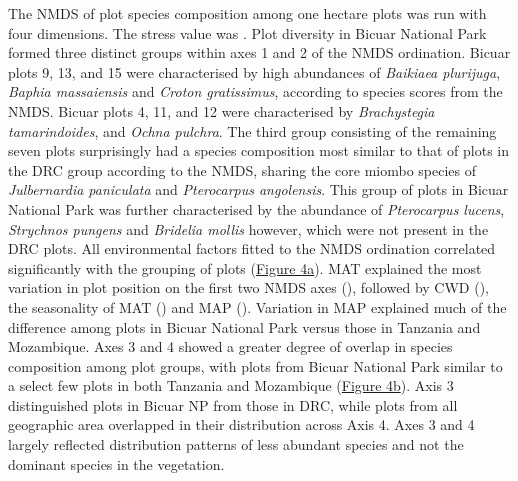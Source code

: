 \documentclass[diversity,article,submit,moreauthors,pdftex]{Definitions/mdpi}
\begin{document}
The NMDS of plot species composition among one hectare plots was run with four dimensions. The stress value was \nmdsstress{}. Plot diversity in Bicuar National Park formed three distinct groups within axes 1 and 2 of the NMDS ordination. Bicuar plots 9, 13, and 15 were characterised by high abundances of \textit{Baikiaea plurijuga}, \textit{Baphia massaiensis} and \textit{Croton gratissimus}, according to species scores from the NMDS. Bicuar plots 4, 11, and 12 were characterised  by \textit{Brachystegia tamarindoides}, and \textit{Ochna pulchra}. The third group consisting of the remaining seven plots surprisingly had a species composition most similar to that of plots in the DRC group according to the NMDS, sharing the core miombo species of \textit{Julbernardia paniculata} and \textit{Pterocarpus angolensis}. This group of plots in Bicuar National Park was further characterised by the abundance of \textit{Pterocarpus lucens}, \textit{Strychnos pungens} and \textit{Bridelia mollis} however, which were not present in the DRC plots. All environmental factors fitted to the NMDS ordination correlated significantly with the grouping of plots (\hyperref[all_nmds_envfit]{Figure 4a}). MAT explained the most variation in plot position on the first two NMDS axes (\nmdsmat{}), followed by CWD (\nmdsmapsd{}), the seasonality of MAT (\nmdsmatsd{}) and MAP (\nmdsmap{}). Variation in MAP explained much of the difference among plots in Bicuar National Park versus those in Tanzania and Mozambique. Axes 3 and 4 showed a greater degree of overlap in species composition among plot groups, with plots from Bicuar National Park similar to a select few plots in both Tanzania and Mozambique (\hyperref[all_nmds_envfit_low]{Figure 4b}). Axis 3 distinguished plots in Bicuar NP from those in DRC, while plots from all geographic area overlapped in their distribution across Axis 4. Axes 3 and 4 largely reflected distribution patterns of less abundant species and not the dominant species in the vegetation.
\end{document}
